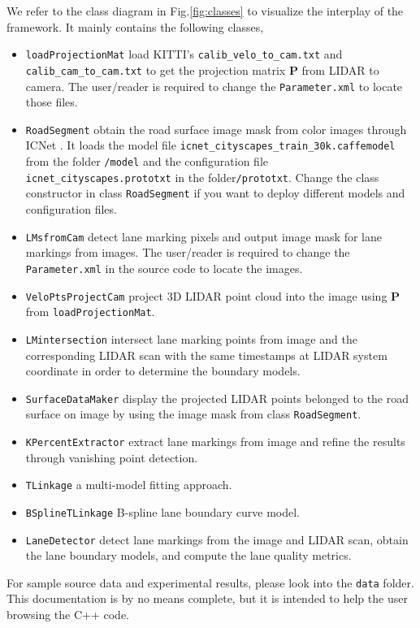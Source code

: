 \documentclass[a4paper]{article}
\begin{document}
We refer to the class diagram in Fig.\ref{fig:classes}  to visualize the interplay of the framework. 
It mainly contains the following classes,
\begin{itemize}
	\item \verb+loadProjectionMat+ load KITTI's \verb+calib_velo_to_cam.txt+ and  \verb+calib_cam_to_cam.txt+ to get the projection matrix $\mathbf{P}$ from LIDAR to camera. The user/reader is required to change the \verb+Parameter.xml+ to locate those files.
	\item \verb+RoadSegment+ obtain the road surface image mask \cite{zhao2017icnet} from color images through ICNet \cite{zhao2017icnet}. It loads  the model file \verb+icnet_cityscapes_train_30k.caffemodel+ from the folder \verb+/model+ and the configuration file  \verb+icnet_cityscapes.prototxt+ in the folder\verb+/prototxt+.  Change the class constructor in class \verb+RoadSegment+ if you want to deploy different models and configuration files. 
	\item \verb+LMsfromCam+ detect lane marking pixels  and output  image mask for lane markings from images. The user/reader is required to change the \verb+Parameter.xml+ in the source code to locate the images. 
	\item \verb+VeloPtsProjectCam+ project 3D LIDAR point cloud into the image using  $\mathbf{P}$ from \verb+loadProjectionMat+. 
	\item \verb+LMintersection+ intersect lane marking points from image and the corresponding LIDAR scan with the same timestamps at LIDAR system coordinate in order to determine the boundary models. 
	\item \verb+SurfaceDataMaker+ display the projected LIDAR points belonged to the road surface on image by using the image mask from class \verb+RoadSegment+. 
	\item \verb+KPercentExtractor+ extract lane markings from image and refine the results through vanishing point detection.
	\item \verb+TLinkage+  a multi-model fitting approach.
	\item \verb+BSplineTLinkage+ B-spline lane boundary curve model.
	\item \verb+LaneDetector+ detect lane markings from the image and LIDAR scan,  obtain the lane boundary models, and compute the lane quality metrics. 
\end{itemize}






For sample source data and experimental results, please look into the \verb+data+ folder. This documentation is by no means complete, but it is intended to help the user browsing the C++ code.
\end{document}
